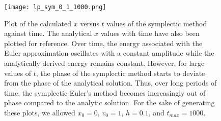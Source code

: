 \documentclass{article}
\begin{document}
\begin{figure}
    \centering
    \texttt{[image: lp\_sym\_0\_1\_1000.png]}{}
    \caption{Plot of the calculated $x$ versus $t$ values of the symplectic method against time.  The analytical $x$ values with time have also been plotted for reference. Over time, the energy associated with the Euler approximation oscillates with a constant amplitude while the analytically derived energy remains constant.  However, for large values of $t$, the phase of the symplectic method starts to deviate from the phase of the analytical solution.  Thus, over long periods of time, the symplectic Euler's method becomes increasingly out of phase compared to the analytic solution.  For the sake of generating these plots, we allowed $x_0 = 0$, $v_0 = 1$, $h = 0.1$, and $t_{max} = 1000$.}
    \label{fig:phase_err}
\end{figure}
\end{document}
